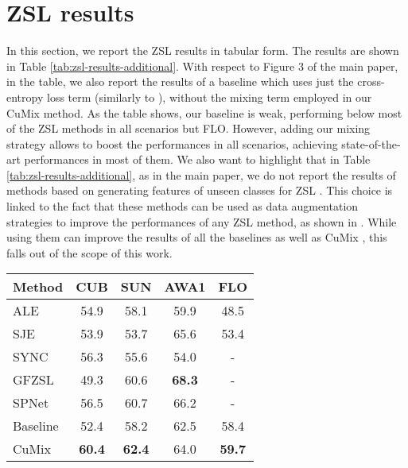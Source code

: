 \documentclass[runningheads]{llncs}
\newcommand{\methodName}{{CuMix} }
\begin{document}
\section{ZSL results}
In this section, we report the ZSL results in tabular form. The results are shown in Table \ref{tab:zsl-results-additional}. With respect to Figure 3 of the main paper, in the table, we also report the results of a baseline which uses just the cross-entropy loss term (similarly to \cite{xian2019semantic}), without the mixing term employed in our \methodName method. As the table shows, our baseline is weak, performing below most of the ZSL methods in all scenarios but FLO. However, adding our mixing strategy allows to boost the performances in all scenarios, achieving state-of-the-art performances in most of them. We also want to highlight that in Table \ref{tab:zsl-results-additional}, as in the main paper, we do not report the results of methods based on generating features of unseen classes for ZSL \cite{xian2018feature,xian2019fvaegan}. This choice is linked to the fact that these methods can be used as data augmentation strategies to improve the performances of any ZSL method, as shown in \cite{xian2018feature}. While using them can improve the results of all the baselines as well as \methodName, this falls out of the scope of this work.

\begin{table*}[t]
			\caption{ZSL results.}\centering
		\begin{tabular}{ l |  c  c  c  c}
		Method&CUB&SUN&AWA1&FLO\\
		\hline
		ALE  \cite{akata2013label}   & 54.9  & 58.1  & 59.9& 48.5   \\
		SJE   \cite{akata2015evaluation}  &  53.9 & 53.7  &   65.6& 53.4 \\
		SYNC   \cite{changpinyo2016synthesized}  &  56.3 & 55.6   & 54.0& -  \\
		GFZSL \cite{verma2017simple}    &  49.3 & 60.6  & \textbf{68.3}&  -  \\
		SPNet \cite{xian2019semantic}    & 56.5  & 60.7  & 66.2& -  \\
		\hline
		Baseline  & 52.4  & 58.2 & 62.5 & 58.4 \\
\methodName      & \textbf{{60.4}} & \textbf{62.4} & 64.0  &\textbf{ 59.7 }\\
		\end{tabular}
		\label{tab:zsl-results-additional}
\end{table*}
 
\end{document}
